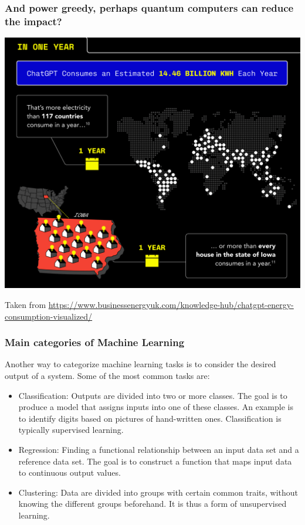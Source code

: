 \documentclass{beamer}
\begin{document}
\begin{frame}
\frametitle{And power greedy, perhaps quantum computers can reduce the impact?}

\centerline{\includegraphics[width=0.7\linewidth]{figures/aitalk1.png}}
Taken from \url{https://www.businessenergyuk.com/knowledge-hub/chatgpt-energy-consumption-visualized/}
\end{frame}



\begin{frame}
\frametitle{Main categories of Machine Learning}

\begin{block}{}
Another way to categorize machine learning tasks is to consider the desired output of a system.
Some of the most common tasks are:

\begin{itemize}
  \item Classification: Outputs are divided into two or more classes. The goal is to   produce a model that assigns inputs into one of these classes. An example is to identify  digits based on pictures of hand-written ones. Classification is typically supervised learning.

  \item Regression: Finding a functional relationship between an input data set and a reference data set.   The goal is to construct a function that maps input data to continuous output values.

  \item Clustering: Data are divided into groups with certain common traits, without knowing the different groups beforehand.  It is thus a form of unsupervised learning.
\end{itemize}

\noindent
\end{block}
\end{frame}
\end{document}
